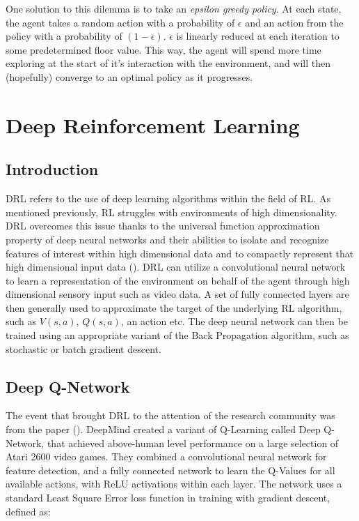 One solution to this dilemma is to take an \textit{epsilon greedy policy}. At each state, the agent
takes a random action with a probability of $\epsilon$ and an action from the policy with a
probability of $(1-\epsilon)$. $\epsilon$ is linearly reduced at each iteration to some
predetermined floor value. This way, the agent will spend more time exploring at the start of it's
interaction with the environment, and will then (hopefully) converge to an optimal policy as it progresses.

\section{Deep Reinforcement Learning} \label{sec:drl_background}
\subsection{Introduction}
DRL refers to the use of deep learning algorithms within the field of RL. As mentioned previously, RL struggles with environments of high dimensionality. DRL overcomes this issue thanks to the universal function approximation property of deep neural networks and their abilities to isolate and recognize features of interest within high dimensional data and to compactly represent that high dimensional input data (\citet{survey-drl}). DRL can utilize a convolutional neural network to learn a representation of the environment on behalf of the agent through high dimensional sensory input such as video data. A set of fully connected layers are then generally used to approximate the target of the underlying RL algorithm, such as $V(s, a)$, $Q(s, a)$, an action etc. The deep neural network can then be trained using an appropriate variant of the Back Propagation algorithm, such as stochastic or batch gradient descent. \paragraph{}

\subsection{Deep Q-Network}
The event that brought DRL to the attention of the research community was from the paper (\citet{deepmind1}). DeepMind created a variant of Q-Learning called Deep Q-Network, that achieved above-human level performance on a large selection of Atari 2600 video games. They combined a convolutional neural network for feature detection, and a fully connected network to learn the Q-Values for all available actions, with ReLU activations within each layer. The network uses a standard Least Square Error loss function in training with gradient descent, defined as:

